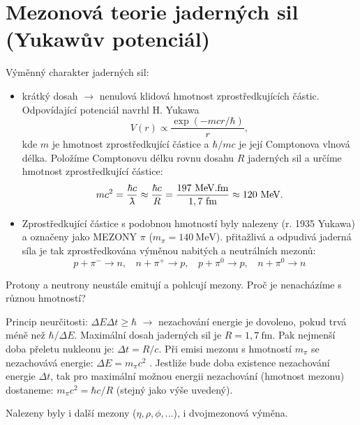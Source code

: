 \documentclass[../../main.tex]{subfiles}
\begin{document}
\section{Mezonová teorie jaderných sil (Yukawův potenciál)}

Výměnný charakter jaderných sil:
\begin{itemize}
	\item krátký dosah $\rightarrow$ nenulová klidová hmotnost zprostředkujících částic. Odpovídající potenciál navrhl H. Yukawa 
	\begin{equation}
	V(r) \propto \dfrac{\exp(-m c r/ \hbar)}{r},
	\end{equation}
	kde $m$ je hmotnost zprostředkující částice a $\hbar /mc$ je její Comptonova vlnová délka. Položíme Comptonovu délku rovnu dosahu $R$ jaderných sil a určíme hmotnost zprostředkující částice:
	\begin{equation}
	mc^2 = \dfrac{\hbar c}{\lambdabar} \approx  \dfrac{\hbar c}{R} = \dfrac{197 ~\mathrm{MeV.fm}}{1,7 ~\mathrm{fm}} \approx 120 ~\mathrm{MeV}. 
	\end{equation}
	
	\item Zprostředkující částice s podobnou hmotností byly nalezeny (r. 1935 Yukawa) a označeny jako MEZONY $\pi$ ($m_{\pi} = 140 ~\mathrm{MeV}$). přitažlivá a odpudivá jaderná síla je tak zprostředkována výměnou nabitých a neutrálních mezonů:
	\begin{equation}
	p+ \pi^- \rightarrow n, ~~~~ n + \pi^+ \rightarrow p, ~~~~ p + \pi^0 \rightarrow p, ~~~~ n + \pi^0 \rightarrow n 
	\end{equation}
\end{itemize}

Protony a neutrony neustále emitují a pohlcují mezony. Proč je nenacházíme s různou hmotností?

Princip neurčitosti: $\Delta E \Delta t \geq \hbar$ $\rightarrow$ nezachování energie je dovoleno, pokud trvá méně než $\hbar/\Delta E$. Maximální dosah jaderných sil je $R = 1,7 ~\mathrm{fm}$. Pak nejmenší doba přeletu nukleonu je: $ \Delta t = R/c$. Při emisi mezonu s hmotností $m_{\pi}$ se nezachovává energie: $\Delta E = m_{\pi}c^2$ . Jestliže bude doba existence nezachování energie $\Delta t$, tak pro maximální možnou energii nezachování (hmotnost mezonu) dostaneme: $m_{\pi}c^2 = \hbar c /R
$ (stejný jako výše uvedený).

Nalezeny byly i další mezony ($\eta, \rho, \phi, ...$), i dvojmezonová výměna.
\end{document}
